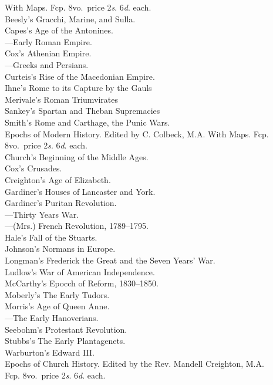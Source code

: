 \documentclass[letterpaper,12pt,oneside,openany]{memoir}
\newcommand{\D}{\hspace*{5mm}}
\newcommand{\E}{\hspace*{2mm}---\hspace*{2mm}}
\begin{document}
\begin{footnotesize}
\D With Maps. Fcp. 8vo.\ price 2\textit{s}. 6\textit{d}. each.\\
\D Beesly's Gracchi, Marine, and Sulla. \\
\D Capes's Age of the Antonines. \\
\D \E Early Roman Empire.  \\
\D Cox's Athenian Empire. \\
\D \E Greeks and Persians.\\
\D Curteis's Rise of the Macedonian Empire.\\
\D Ihne's Rome to its Capture by the Gauls\\
\D Merivale's Roman Triumvirates\\
\D Sankey's Spartan and Theban Supremacies\\
\D Smith's Rome and Carthage, the Punic Wars.\\
Epochs of Modern History. Edited by C. Colbeck, M.A.
With Maps. Fcp. 8vo.\ price 2\textit{s}. 6\textit{d}. each.\\
\D Church's Beginning of the Middle Ages.\\
\D Cox's Crusades.\\
\D Creighton's Age of Elizabeth.\\
\D Gardiner's Houses of Lancaster and York.\\
\D Gardiner's Puritan Revolution.\\
\D \E Thirty Years War.\\
\D \E (Mrs.) French Revolution, 1789--1795.\\
\D Hale's Fall of the Stuarts.\\
\D Johnson's Normans in Europe.\\
\D Longman's Frederick the Great and the Seven Years' War.\\
\D Ludlow's War of American Independence.\\
\D McCarthy's Epocch of Reform, 1830--1850.\\
\D Moberly's The Early Tudors.\\
\D Morris's Age of Queen Anne.\\
\D \E The Early Hanoverians.\\
\D Seebohm's Protestant Revolution. \\
\D Stubbs's The Early Plantagenets.\\
\D Warburton's Edward III.\\
Epochs of Church History. Edited by the Rev. Mandell Creighton, M.A.\\
\D Fcp. 8vo.\ price 2\textit{s}. 6\textit{d}. each.\\

\end{footnotesize}
\end{document}
